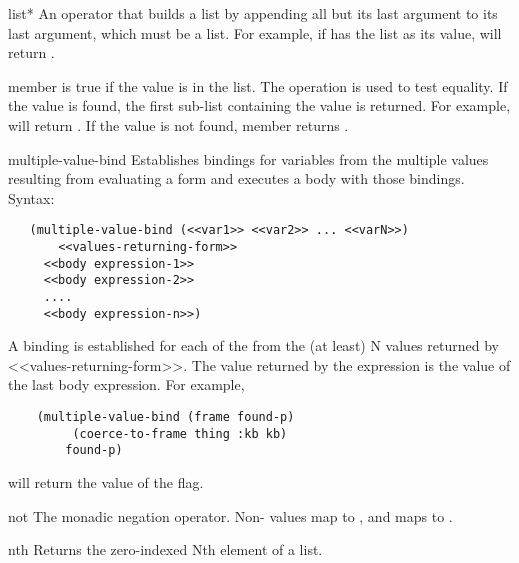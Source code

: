 \begin{okbcfspec}{list*}
An operator that builds a list by appending all but its last
argument to its last argument, which must be a list.
For example, if  has the list  as its
value,  will return
.
\end{okbcfspec}

\begin{okbcfspec}{member}
 is true if the value is in
the list.  The operation  is used to test
equality.
If the value is found, the first sub-list
containing the value is returned.
For example, 
will return .  If the value is not found,
member returns .
\end{okbcfspec}

\begin{okbcfspec}{multiple-value-bind}
Establishes bindings for variables from the multiple values
resulting from evaluating a form and executes a body with
those bindings.
Syntax:
\begin{verbatim}
   (multiple-value-bind (<<var1>> <<var2>> ... <<varN>>)
       <<values-returning-form>>
     <<body expression-1>>
     <<body expression-2>>
     ....
     <<body expression-n>>)
\end{verbatim}
A binding is established for each of the 
from the (at least) N values returned by
<<values-returning-form>>.  The value returned by the
 expression is the value of the
last body expression.  For example,
\begin{verbatim}
	(multiple-value-bind (frame found-p)
         (coerce-to-frame thing :kb kb)
        found-p)
\end{verbatim}
will return the value of the  flag.
\end{okbcfspec}

\begin{okbcfspec}{not}
The monadic negation operator.  Non- values map to ,
and  maps to .
\end{okbcfspec}

\begin{okbcfspec}{nth}
Returns the zero-indexed Nth element of a list.\\
\\
\\
\end{okbcfspec}


